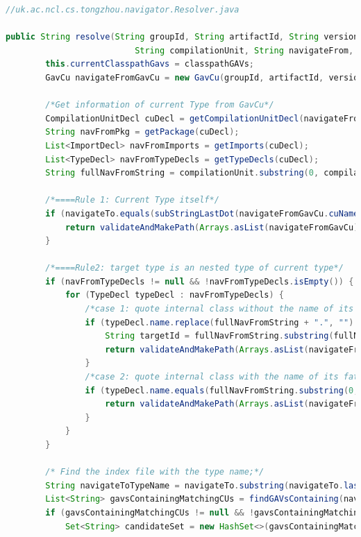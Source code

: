 \documentclass[runningheads]{llncs}
\begin{document}
\begin{lstlisting}[language=Java, caption=Main navigation algorithm]
//uk.ac.ncl.cs.tongzhou.navigator.Resolver.java

public String resolve(String groupId, String artifactId, String version,
                          String compilationUnit, String navigateFrom, String navigateTo, List<String> classpathGAVs) throws IOException {
        this.currentClasspathGavs = classpathGAVs;
        GavCu navigateFromGavCu = new GavCu(groupId, artifactId, version, compilationUnit);

        /*Get information of current Type from GavCu*/
        CompilationUnitDecl cuDecl = getCompilationUnitDecl(navigateFromGavCu);
        String navFromPkg = getPackage(cuDecl);
        List<ImportDecl> navFromImports = getImports(cuDecl);
        List<TypeDecl> navFromTypeDecls = getTypeDecls(cuDecl);
        String fullNavFromString = compilationUnit.substring(0, compilationUnit.lastIndexOf(".") + 1) + navigateFrom;

        /*====Rule 1: Current Type itself*/
        if (navigateTo.equals(subStringLastDot(navigateFromGavCu.cuName.replace(navFromPkg + ".", "")))) {
            return validateAndMakePath(Arrays.asList(navigateFromGavCu).stream(), null);
        }

        /*====Rule2: target type is an nested type of current type*/
        if (navFromTypeDecls != null && !navFromTypeDecls.isEmpty()) {
            for (TypeDecl typeDecl : navFromTypeDecls) {
                /*case 1: quote internal class without the name of its father class, eg: InternalClass class; */
                if (typeDecl.name.replace(fullNavFromString + ".", "").equals(navigateTo)) {
                    String targetId = fullNavFromString.substring(fullNavFromString.lastIndexOf(".") + 1, fullNavFromString.length());
                    return validateAndMakePath(Arrays.asList(navigateFromGavCu).stream(), targetId + "." + navigateTo);
                }
                /*case 2: quote internal class with the name of its father class, eg: ThisClass.InternalClass class; */
                if (typeDecl.name.equals(fullNavFromString.substring(0, fullNavFromString.lastIndexOf(".")) + "." + navigateTo)) {
                    return validateAndMakePath(Arrays.asList(navigateFromGavCu).stream(), navigateTo);
                }
            }
        }

        /* Find the index file with the type name;*/
        String navigateToTypeName = navigateTo.substring(navigateTo.lastIndexOf(".") + 1, navigateTo.length());
        List<String> gavsContainingMatchingCUs = findGAVsContaining(navigateToTypeName);
        if (gavsContainingMatchingCUs != null && !gavsContainingMatchingCUs.isEmpty()) {
            Set<String> candidateSet = new HashSet<>(gavsContainingMatchingCUs);


\end{lstlisting}
\end{document}
